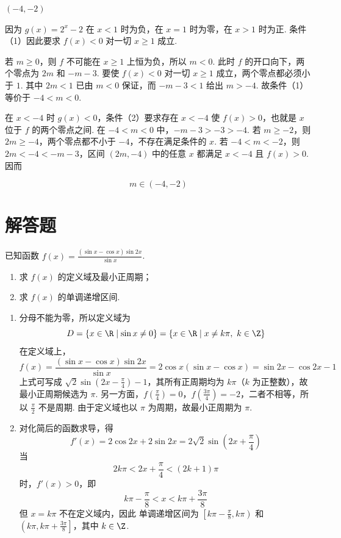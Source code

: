 \begin{answer}
\((-4,-2)\)
\end{answer}

\begin{solution}
因为 \(g(x)=2^x-2\) 在 \(x<1\) 时为负，在 \(x=1\) 时为零，在 \(x>1\) 时为正. 条件（1）因此要求 \(f(x)<0\) 对一切 \(x\geqslant1\) 成立.

若 \(m\geqslant0\)，则 \(f\) 不可能在 \(x\geqslant1\) 上恒为负，所以 \(m<0\). 此时 \(f\) 的开口向下，两个零点为 \(2m\) 和 \(-m-3\). 要使 \(f(x)<0\) 对一切 \(x\geqslant1\) 成立，两个零点都必须小于 \(1\). 其中 \(2m<1\) 已由 \(m<0\) 保证，而 \(-m-3<1\) 给出 \(m>-4\). 故条件（1）等价于 \(-4<m<0\).

在 \(x<-4\) 时 \(g(x)<0\)，条件（2）要求存在 \(x<-4\) 使 \(f(x)>0\)，也就是 \(x\) 位于 \(f\) 的两个零点之间. 在 \(-4<m<0\) 中，\(-m-3>-3>-4\). 若 \(m\geqslant-2\)，则 \(2m\geqslant-4\)，两个零点都不小于 \(-4\)，不存在满足条件的 \(x\). 若 \(-4<m<-2\)，则 \(2m<-4<-m-3\)，区间 \((2m,-4)\) 中的任意 \(x\) 都满足 \(x<-4\) 且 \(f(x)>0\). 因而

\[
m\in(-4,-2)
\]
\end{solution}

\section{解答题}

\begin{problem}
已知函数 \(f(x)=\frac{(\sin x-\cos x)\sin 2x}{\sin x}\).

\begin{enumerate}
\item 求 \(f(x)\) 的定义域及最小正周期；
\item 求 \(f(x)\) 的单调递增区间.
\end{enumerate}
\end{problem}

\begin{solution}
\begin{enumerate}
\item 分母不能为零，所以定义域为
\[
D=\{x\in\R\mid \sin x\ne0\}=\{x\in\R\mid x\ne k\pi,\ k\in\Z\}
\]
在定义域上，
\[
f(x)=\frac{(\sin x-\cos x)\sin2x}{\sin x}=2\cos x(\sin x-\cos x)=\sin2x-\cos2x-1
\]
上式可写成 \(\sqrt2\sin\left(2x-\frac{\pi}{4}\right)-1\)，其所有正周期均为 \(k\pi\)（\(k\) 为正整数），故最小正周期候选为 \(\pi\). 另一方面，\(f\left(\frac{\pi}{4}\right)=0\)，\(f\left(\frac{3\pi}{4}\right)=-2\)，二者不相等，所以 \(\frac{\pi}{2}\) 不是周期. 由于定义域也以 \(\pi\) 为周期，故最小正周期为 \(\pi\).
\item 对化简后的函数求导，得
\[
f'(x)=2\cos2x+2\sin2x=2\sqrt2\sin\left(2x+\frac{\pi}{4}\right)
\]
当
\[
2k\pi<2x+\frac{\pi}{4}<(2k+1)\pi
\]
时，\(f'(x)>0\)，即
\[
k\pi-\frac{\pi}{8}<x<k\pi+\frac{3\pi}{8}
\]
但 \(x=k\pi\) 不在定义域内，因此
单调递增区间为 \(\left[k\pi-\frac{\pi}{8},k\pi\right)\) 和 \(\left(k\pi,k\pi+\frac{3\pi}{8}\right]\)，其中 \(k\in\Z\).
\end{enumerate}
\end{solution}

